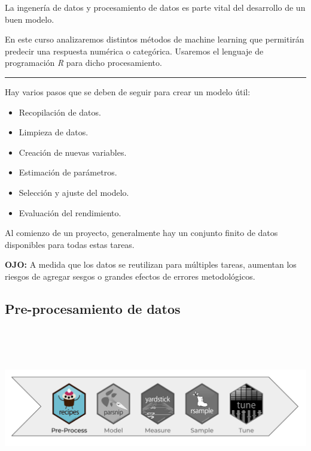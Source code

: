 \documentclass[
]{book}
\providecommand{\tightlist}{%
  \setlength{\itemsep}{0pt}\setlength{\parskip}{0pt}}
\begin{document}
La ingenería de datos y procesamiento de datos es parte vital del desarrollo de un buen modelo.

En este curso analizaremos distintos métodos de machine learning que permitirán predecir una respuesta numérica o categórica. Usaremos el lenguaje de programación \emph{R} para dicho procesamiento.

\begin{center}\rule{0.5\linewidth}{0.5pt}\end{center}

Hay varios pasos que se deben de seguir para crear un modelo útil:

\begin{itemize}
\tightlist
\item
  Recopilación de datos.
\item
  Limpieza de datos.
\item
  Creación de nuevas variables.
\item
  Estimación de parámetros.
\item
  Selección y ajuste del modelo.
\item
  Evaluación del rendimiento.
\end{itemize}

Al comienzo de un proyecto, generalmente hay un conjunto finito de datos disponibles para todas estas tareas.

\textbf{OJO:} A medida que los datos se reutilizan para múltiples tareas, aumentan los riesgos de agregar sesgos o grandes efectos de errores metodológicos.

\hypertarget{pre-procesamiento-de-datos}{%
\subsection{Pre-procesamiento de datos}\label{pre-procesamiento-de-datos}}

\begin{center}\includegraphics[width=800pt,height=200pt]{img/04-ml/3-2-1-preprocesamiento} \end{center}
\end{document}
